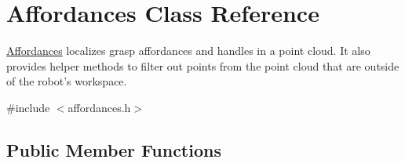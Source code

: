 \hypertarget{class_affordances}{\section{\-Affordances \-Class \-Reference}
\label{class_affordances}
}


\hyperlink{class_affordances}{\-Affordances} localizes grasp affordances and handles in a point cloud. \-It also provides helper methods to filter out points from the point cloud that are outside of the robot's workspace.  




{\ttfamily \#include $<$affordances.\-h$>$}

\subsection*{\-Public \-Member \-Functions}
